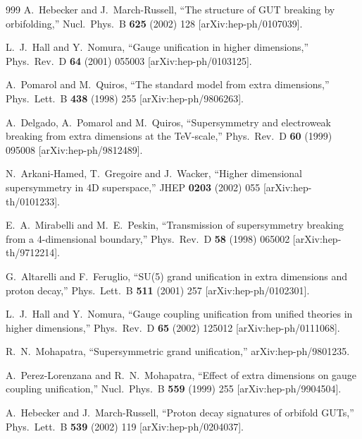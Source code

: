 \begin{thebibliography}{999}
  A.~Hebecker and J.~March-Russell,
  ``The structure of GUT breaking by orbifolding,''
  Nucl.\ Phys.\ B {\bf 625} (2002) 128
  [arXiv:hep-ph/0107039].

  L.~J.~Hall and Y.~Nomura,
  ``Gauge unification in higher dimensions,''
  Phys.\ Rev.\ D {\bf 64} (2001) 055003
  [arXiv:hep-ph/0103125].

  A.~Pomarol and M.~Quiros,
  ``The standard model from extra dimensions,''
  Phys.\ Lett.\ B {\bf 438} (1998) 255
  [arXiv:hep-ph/9806263].

  A.~Delgado, A.~Pomarol and M.~Quiros,
  ``Supersymmetry and electroweak breaking from extra dimensions at the
  TeV-scale,''
  Phys.\ Rev.\ D {\bf 60} (1999) 095008
  [arXiv:hep-ph/9812489].

  N.~Arkani-Hamed, T.~Gregoire and J.~Wacker,
  ``Higher dimensional supersymmetry in 4D superspace,''
  JHEP {\bf 0203} (2002) 055
  [arXiv:hep-th/0101233].

  E.~A.~Mirabelli and M.~E.~Peskin,
  ``Transmission of supersymmetry breaking from a 4-dimensional boundary,''
  Phys.\ Rev.\ D {\bf 58} (1998) 065002
  [arXiv:hep-th/9712214].

  G.~Altarelli and F.~Feruglio,
  ``SU(5) grand unification in extra dimensions and proton decay,''
  Phys.\ Lett.\ B {\bf 511} (2001) 257
  [arXiv:hep-ph/0102301].

  L.~J.~Hall and Y.~Nomura,
  ``Gauge coupling unification from unified theories in higher dimensions,''
  Phys.\ Rev.\ D {\bf 65} (2002) 125012
  [arXiv:hep-ph/0111068].

  R.~N.~Mohapatra,
  ``Supersymmetric grand unification,''
  arXiv:hep-ph/9801235.

  A.~Perez-Lorenzana and R.~N.~Mohapatra,
  ``Effect of extra dimensions on gauge coupling unification,''
  Nucl.\ Phys.\ B {\bf 559} (1999) 255
  [arXiv:hep-ph/9904504].

  A.~Hebecker and J.~March-Russell,
  ``Proton decay signatures of orbifold GUTs,''
  Phys.\ Lett.\ B {\bf 539} (2002) 119
  [arXiv:hep-ph/0204037].


\end{thebibliography}

